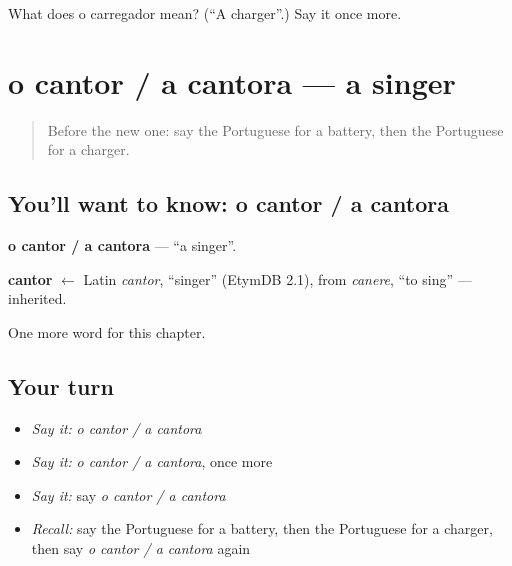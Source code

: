 \begin{tcolorbox}[breakable,colback=teal!4,colframe=teal!35!black,title={Before you move on}]
What does o carregador mean? (\textquotedblleft{}A charger\textquotedblright{}.) Say it once more.
\end{tcolorbox}
\section[o cantor / a cantora]{o cantor / a cantora — a singer}

\label{lesson:PT-C159-cantor-a-cantora}



\begin{quote}
Before the new one: say the Portuguese for a battery, then the Portuguese for a charger.
\end{quote}

\subsection*{You'll want to know: o cantor / a cantora}
\textbf{o cantor / a cantora} — \textquotedblleft{}a singer\textquotedblright{}.

\begin{cousinweb}
\textbf{cantor} $\leftarrow$ Latin \emph{cantor}, \textquotedblleft{}singer\textquotedblright{} (EtymDB 2.1), from \emph{canere}, \textquotedblleft{}to sing\textquotedblright{} — inherited.
\end{cousinweb}

\begin{grammarlens}[title={What you've built}]
One more word for this chapter.
\end{grammarlens}

\subsection*{Your turn}
\begin{itemize}
\raggedright
  \item \emph{Say it:} \emph{o cantor / a cantora}
  \item \emph{Say it:} \emph{o cantor / a cantora}, once more
  \item \emph{Say it:} say \emph{o cantor / a cantora}
  \item \emph{Recall:} say the Portuguese for a battery, then the Portuguese for a charger, then say \emph{o cantor / a cantora} again
\end{itemize}

